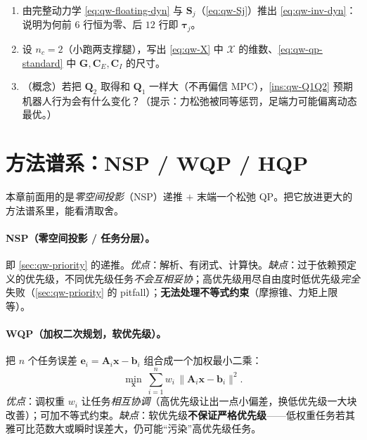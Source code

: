 \begin{practice}
\begin{enumerate}
  \item 由完整动力学 \cref{eq:qw-floating-dyn} 与 $\boldsymbol{S}_j$（\cref{eq:qw-Sj}）推出 \cref{eq:qw-inv-dyn}：说明为何前 $6$ 行恒为零、后 $12$ 行即 $\boldsymbol{\tau}_j$。
  \item 设 $n_c=2$（小跑两支撑腿），写出 \cref{eq:qw-X} 中 $\boldsymbol{\mathcal{X}}$ 的维数、\cref{eq:qw-qp-standard} 中 $\boldsymbol{G},\boldsymbol{C}_E,\boldsymbol{C}_I$ 的尺寸。
  \item （概念）若把 $\boldsymbol{Q}_2$ 取得和 $\boldsymbol{Q}_1$ 一样大（不再偏信 MPC），\cref{ins:qw-Q1Q2} 预期机器人行为会有什么变化？（提示：力松弛被同等惩罚，足端力可能偏离动态最优。）
\end{enumerate}
\end{practice}

\section{方法谱系：NSP / WQP / HQP}
\label{sec:qw-history}

本章前面用的是\emph{零空间投影}（NSP）递推 $+$ 末端一个松弛 QP。把它放进更大的方法谱系里，能看清取舍。

\paragraph{NSP（零空间投影 / 任务分层）。}
即 \cref{sec:qw-priority} 的递推。\emph{优点}：解析、有闭式、计算快。\emph{缺点}：过于依赖预定义的优先级，不同优先级任务\emph{不会互相妥协}；高优先级用尽自由度时低优先级\emph{完全}失败（\cref{sec:qw-priority} 的 pitfall）；\textbf{无法处理不等式约束}（摩擦锥、力矩上限等）。

\paragraph{WQP（加权二次规划，软优先级）。}
把 $n$ 个任务误差 $\boldsymbol{e}_i=\boldsymbol{A}_i\boldsymbol{x}-\boldsymbol{b}_i$ 组合成一个加权最小二乘：
\begin{equation}
  \min_{\boldsymbol{x}}\ \sum_{i=1}^{n} w_i\,\|\boldsymbol{A}_i\boldsymbol{x}-\boldsymbol{b}_i\|^2.
  \label{eq:qw-wqp}
\end{equation}
\emph{优点}：调权重 $w_i$ 让任务\emph{相互协调}（高优先级让出一点小偏差，换低优先级一大块改善）；可加不等式约束。\emph{缺点}：软优先级\textbf{不保证严格优先级}——低权重任务若其雅可比范数大或瞬时误差大，仍可能“污染”高优先级任务。

